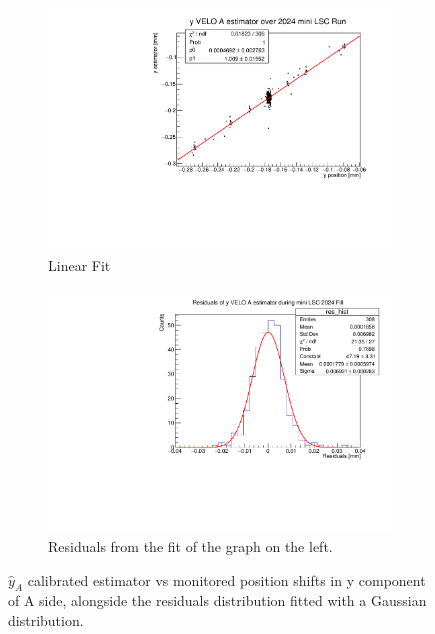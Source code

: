 \begin{figure}
    \centering
    \begin{subfigure}{0.48\textwidth}
    \includegraphics[width=\linewidth]{figures/yVeloA_fit_comparison.pdf}
    \caption{Linear Fit}\label{fig:yAfit_comparison}
    \end{subfigure}
    \begin{subfigure}{0.48\textwidth}
    \includegraphics[width=\linewidth]{figures/yVeloA_res_comparison.pdf}
    \caption{Residuals from the fit of the graph on the left. }\label{fig:yAres_comparison}
    \end{subfigure}
    \caption{$\hat{y}_{A}$ calibrated estimator vs monitored position shifts in y component of A side, alongside the residuals distribution fitted with a Gaussian distribution.}
    \label{fig:yA_comparison}
\end{figure}

